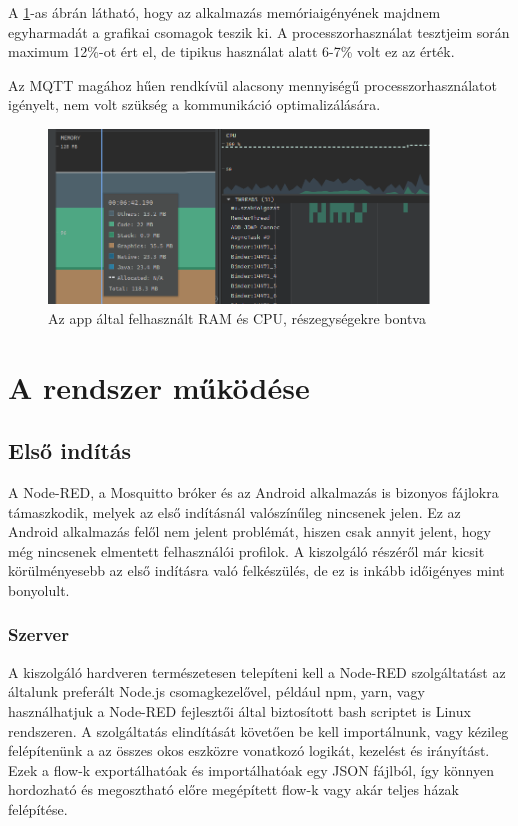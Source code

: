 \documentclass[]{thesis-ekf}
\theoremstyle{definition}
\theoremstyle{remark}
\begin{document}
A \ref{usage}-as ábrán látható, hogy az alkalmazás memóriaigényének majdnem egyharmadát a grafikai csomagok teszik ki.
A processzorhasználat tesztjeim során maximum 12\%-ot ért el, de tipikus használat alatt 6-7\% volt ez az érték.

Az MQTT magához hűen rendkívül alacsony mennyiségű processzorhasználatot igényelt, nem volt szükség a kommunikáció
optimalizálására.
\begin{figure}
	\centering
	\includegraphics[width=0.9\textwidth]{images/profiler_ram_cpu.png}
	\caption{Az app által felhasznált RAM és CPU, részegységekre bontva}
	\label{usage}
\end{figure}

\chapter{A rendszer működése}
\section{Első indítás}
A Node-RED, a Mosquitto bróker és az Android alkalmazás  is bizonyos fájlokra támaszkodik, melyek az első indításnál
valószínűleg nincsenek jelen. Ez az Android alkalmazás felől nem jelent problémát, hiszen csak annyit jelent, hogy még nincsenek
elmentett felhasználói profilok. A kiszolgáló részéről már kicsit körülményesebb az első indításra való felkészülés,
de ez is inkább időigényes mint bonyolult.
\subsection{Szerver}
A kiszolgáló hardveren természetesen telepíteni kell a Node-RED szolgáltatást az általunk preferált Node.js
csomagkezelővel, például npm, yarn, vagy használhatjuk a Node-RED fejlesztői által biztosított bash scriptet is Linux rendszeren.
A szolgáltatás elindítását követően be kell importálnunk, vagy kézileg felépítenünk a az összes okos eszközre vonatkozó
logikát, kezelést és irányítást. Ezek a flow-k exportálhatóak és importálhatóak egy JSON fájlból, így könnyen hordozható
és megosztható előre megépített flow-k vagy akár teljes házak felépítése.
\end{document}
